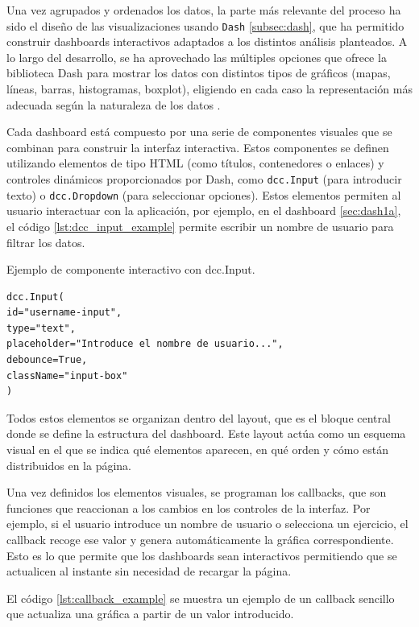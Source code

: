 \documentclass[a4paper, 12pt]{book}
\begin{document}
Una vez agrupados y ordenados los datos, la parte más relevante del proceso ha sido el diseño de las visualizaciones usando \texttt{Dash} \ref{subsec:dash}, que ha permitido construir dashboards interactivos adaptados a los distintos análisis planteados. A lo largo del desarrollo, se ha aprovechado las múltiples opciones que ofrece la biblioteca Dash para mostrar los datos con distintos tipos de gráficos (mapas, líneas, barras, histogramas, boxplot), eligiendo en cada caso la representación más adecuada según la naturaleza de los datos \cite{rGraphGallery}.

Cada dashboard está compuesto por una serie de componentes visuales que se combinan para construir la interfaz interactiva. Estos componentes se definen utilizando elementos de tipo HTML (como títulos, contenedores o enlaces) y controles dinámicos proporcionados por Dash, como \texttt{dcc.Input} (para introducir texto) o \texttt{dcc.Dropdown} (para seleccionar opciones). Estos elementos permiten al usuario interactuar con la aplicación, por ejemplo, en el dashboard \ref{sec:dash1a}, el código \ref{lst:dcc_input_example} permite escribir un nombre de usuario para filtrar los datos.

\begin{listing}[h!]
\caption{Ejemplo de componente interactivo con dcc.Input.}{}
\label{lst:dcc_input_example}
\begin{verbatim}
dcc.Input(
id="username-input",
type="text",
placeholder="Introduce el nombre de usuario...",
debounce=True,
className="input-box"
)
\end{verbatim}
\end{listing}

Todos estos elementos se organizan dentro del layout, que es el bloque central donde se define la estructura del dashboard. Este layout actúa como un esquema visual en el que se indica qué elementos aparecen, en qué orden y cómo están distribuidos en la página.

Una vez definidos los elementos visuales, se programan los callbacks, que son funciones que reaccionan a los cambios en los controles de la interfaz. Por ejemplo, si el usuario introduce un nombre de usuario o selecciona un ejercicio, el callback recoge ese valor y genera automáticamente la gráfica correspondiente. Esto es lo que permite que los dashboards sean interactivos permitiendo que se actualicen al instante sin necesidad de recargar la página.

El código \ref{lst:callback_example} se muestra un ejemplo de un callback sencillo que actualiza una gráfica a partir de un valor introducido.
\end{document}
